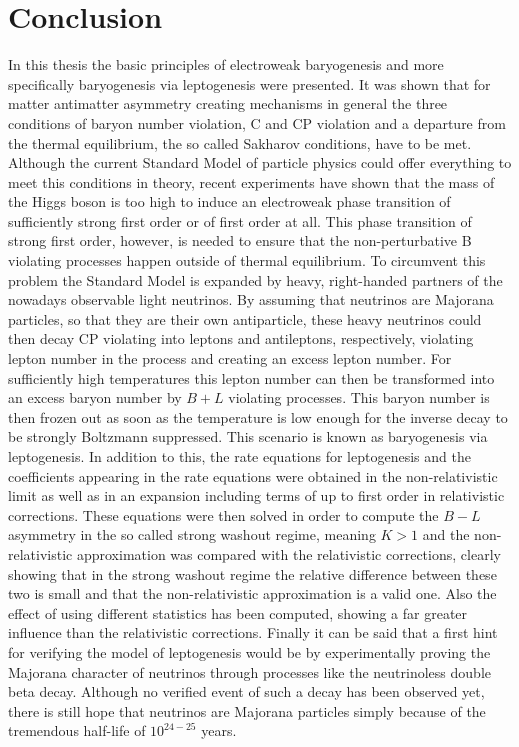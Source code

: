 \chapter{Conclusion}
In this thesis the basic principles of electroweak baryogenesis and more specifically baryogenesis via leptogenesis were presented. It was shown that for matter antimatter asymmetry creating mechanisms in general the three conditions of baryon number violation, C and CP violation and a departure from the thermal equilibrium, the so called Sakharov conditions, have to be met. \newline \indent
Although the current Standard Model of particle physics could offer everything to meet this conditions in theory, recent experiments have shown that the mass of the Higgs boson is too high to induce an  electroweak phase transition of sufficiently strong first order or of first order at all. This phase transition of strong first order, however, is needed to ensure that the non-perturbative B violating processes happen outside of thermal equilibrium. \newline \indent
To circumvent this problem the Standard Model is expanded by heavy, right-handed partners of the nowadays observable light neutrinos. By assuming that neutrinos are Majorana particles, so that they are their own antiparticle, these heavy neutrinos could then decay CP violating into leptons and antileptons, respectively, violating lepton number in the process and creating an excess lepton number. For sufficiently high temperatures this lepton number can then be transformed into an excess baryon number by $B+L$ violating processes. This baryon number is then frozen out as soon as the temperature is low enough for the inverse decay to be strongly Boltzmann suppressed. This scenario is known as baryogenesis via leptogenesis. \newline \indent
In addition to this, the rate equations for leptogenesis and the coefficients appearing in the rate equations were obtained in the non-relativistic limit as well as in an expansion including terms of up to first order in relativistic corrections. These equations were then solved in order to compute the $B-L$ asymmetry in the so called strong washout regime, meaning $K>1$ and the non-relativistic approximation was compared with the relativistic corrections, clearly showing that in the strong washout regime the relative difference between these two is small and that the non-relativistic approximation is a valid one. Also the effect of using different statistics has been computed, showing a far greater influence than the relativistic corrections.  \newline \indent
Finally it can be said that a first hint for verifying the model of leptogenesis would be by experimentally proving the Majorana character of neutrinos through processes like the neutrinoless double beta decay. Although no verified event of such a decay has been observed yet, there is still hope that neutrinos are Majorana particles simply because of the tremendous half-life of $10^{24-25}$ years\cite{Arnold:2016ezh}.

